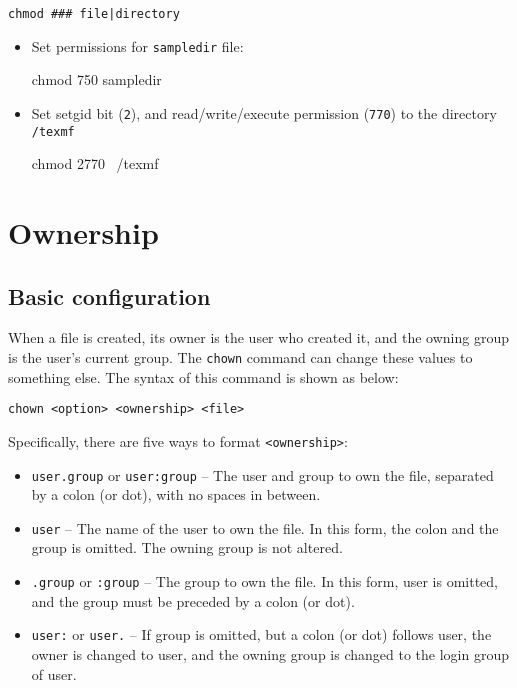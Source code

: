 \begin{verbatim}
chmod ### file|directory
\end{verbatim}

\begin{itemize}
\item Set permissions for \verb|sampledir| file:

\begin{commandshell}
chmod 750 sampledir
\end{commandshell}

\item Set setgid bit (\verb|2|), and read/write/execute permission (\verb|770|) to the directory \verb|/texmf|
\begin{commandshell}
chmod 2770 ~/texmf
\end{commandshell}
\end{itemize}

\section{Ownership}

\subsection{Basic configuration}

When a file is created, its owner is the user who created it, and the owning group is the user's current group. The \verb|chown| command can change these values to something else. The syntax of this command is shown as below:

\begin{verbatim}
chown <option> <ownership> <file>
\end{verbatim}

Specifically, there are five ways to format \verb|<ownership>|:

\begin{itemize}
\item \verb|user.group| or \verb|user:group| -- The user and group to own the file, separated by a colon (or dot), with no spaces in between.
\item \verb|user| -- The name of the user to own the file. In this form, the colon \code{:} and the group is omitted. The owning group is not altered.
\item \verb|.group| or \verb|:group| -- The group to own the file. In this form, user is omitted, and the group must be preceded by a colon (or dot).
\item \verb|user:| or \verb|user.| -- If group is omitted, but a colon (or dot) follows user, the owner is changed to user, and the owning group is changed to the login group of user.
\end{itemize}

